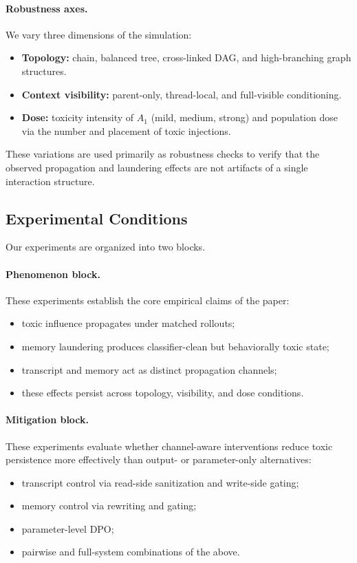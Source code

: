 \paragraph{Robustness axes.}
We vary three dimensions of the simulation:
\begin{itemize}
    \item \textbf{Topology:} chain, balanced tree, cross-linked DAG, and high-branching graph structures.
    \item \textbf{Context visibility:} parent-only, thread-local, and full-visible conditioning.
    \item \textbf{Dose:} toxicity intensity of $A_1$ (mild, medium, strong) and population dose via the number and placement of toxic injections.
\end{itemize}
These variations are used primarily as robustness checks to verify that the observed propagation and laundering effects are not artifacts of a single interaction structure.

\subsection{Experimental Conditions}
\label{sec:exp_conditions}

Our experiments are organized into two blocks.

\paragraph{Phenomenon block.}
These experiments establish the core empirical claims of the paper:
\begin{itemize}
    \item toxic influence propagates under matched rollouts;
    \item memory laundering produces classifier-clean but behaviorally toxic state;
    \item transcript and memory act as distinct propagation channels;
    \item these effects persist across topology, visibility, and dose conditions.
\end{itemize}

\paragraph{Mitigation block.}
These experiments evaluate whether channel-aware interventions reduce toxic persistence more effectively than output- or parameter-only alternatives:
\begin{itemize}
    \item transcript control via read-side sanitization and write-side gating;
    \item memory control via rewriting and gating;
    \item parameter-level DPO;
    \item pairwise and full-system combinations of the above.
\end{itemize}

